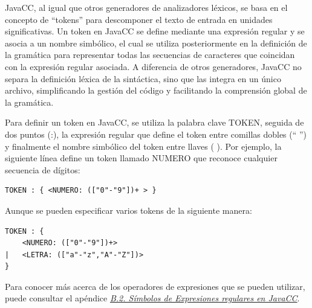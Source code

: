 

JavaCC, al igual que otros generadores de analizadores léxicos, se basa en el concepto de ``tokens'' para descomponer el texto de entrada en unidades significativas. Un token en JavaCC se define mediante una expresión regular y se asocia a un nombre simbólico, el cual se utiliza posteriormente en la definición de la gramática para representar todas las secuencias de caracteres que coincidan con la expresión regular asociada. A diferencia de otros generadores, JavaCC no separa la definición léxica de la sintáctica, sino que las integra en un único archivo, simplificando la gestión del código y facilitando la comprensión global de la gramática.

Para definir un token en JavaCC, se utiliza la palabra clave TOKEN, seguida de dos puntos (:), la expresión regular que define el token entre comillas dobles (`` '') y finalmente el nombre simbólico del token entre llaves ({ }). Por ejemplo, la siguiente línea define un token llamado NUMERO que reconoce cualquier secuencia de dígitos:

\lstset{inputencoding=utf8/latin1}
\begin{lstlisting}
TOKEN : { <NUMERO: (["0"-"9"])+ > } 
\end{lstlisting}

Aunque se pueden especificar varios tokens de la siguiente manera:

\lstset{inputencoding=utf8/latin1}
\begin{lstlisting}
TOKEN : {
	<NUMERO: (["0"-"9"])+>
|	<LETRA: (["a"-"z","A"-"Z"])>
}
\end{lstlisting}

Para conocer más acerca de los operadores de expresiones que se pueden utilizar, puede consultar el apéndice \hyperref[sec:simbolosdeexpresionesregulares]{\textit{B.2. Símbolos de Expresiones regulares en JavaCC}}.


